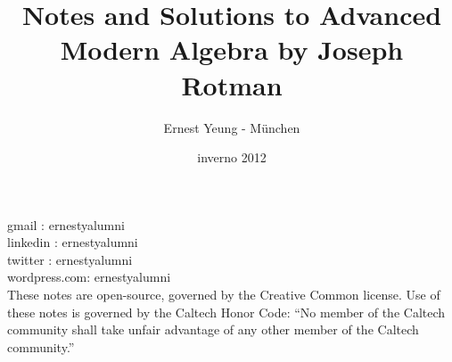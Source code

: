 \documentclass[twoside,landscape]{amsart}
\title{Notes and Solutions to Advanced Modern Algebra by Joseph Rotman
}
\author{
  Ernest Yeung - M\"{u}nchen
       }
\date{inverno 2012}
\theoremstyle{plain}
\theoremstyle{definition}
\theoremstyle{remark}
\begin{document}

\maketitle


\noindent gmail        : ernestyalumni \\
linkedin     : ernestyalumni \\
twitter      : ernestyalumni \\
wordpress.com: ernestyalumni \\


These notes are open-source, governed by the Creative Common license.  Use of these notes is governed by the Caltech Honor Code: ``No member of the Caltech community shall take unfair advantage of any other member of the Caltech community.'' \\
\tableofcontents


\lstlistoflistings
\end{document}
